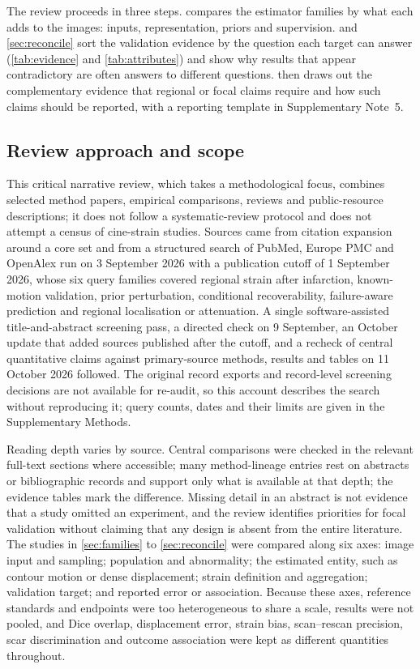 The review proceeds in three steps.  compares the estimator families by what each adds to the images: inputs, representation, priors and supervision.  and \cref{sec:reconcile} sort the validation evidence by the question each target can answer (\cref{tab:evidence} and \cref{tab:attributes}) and show why results that appear contradictory are often answers to different questions.  then draws out the complementary evidence that regional or focal claims require and how such claims should be reported, with a reporting template in Supplementary Note~5.

\subsection{Review approach and scope}

This critical narrative review, which takes a methodological focus, combines selected method papers, empirical comparisons, reviews and public-resource descriptions; it does not follow a systematic-review protocol and does not attempt a census of cine-strain studies. Sources came from citation expansion around a core set and from a structured search of PubMed, Europe PMC and OpenAlex run on 3 September 2026 with a publication cutoff of 1 September 2026, whose six query families covered regional strain after infarction, known-motion validation, prior perturbation, conditional recoverability, failure-aware prediction and regional localisation or attenuation. A single software-assisted title-and-abstract screening pass, a directed check on 9 September, an October update that added sources published after the cutoff, and a recheck of central quantitative claims against primary-source methods, results and tables on 11 October 2026 followed. The original record exports and record-level screening decisions are not available for re-audit, so this account describes the search without reproducing it; query counts, dates and their limits are given in the Supplementary Methods.

Reading depth varies by source. Central comparisons were checked in the relevant full-text sections where accessible; many method-lineage entries rest on abstracts or bibliographic records and support only what is available at that depth; the evidence tables mark the difference. Missing detail in an abstract is not evidence that a study omitted an experiment, and the review identifies priorities for focal validation without claiming that any design is absent from the entire literature. The studies in \cref{sec:families} to \cref{sec:reconcile} were compared along six axes: image input and sampling; population and abnormality; the estimated entity, such as contour motion or dense displacement; strain definition and aggregation; validation target; and reported error or association. Because these axes, reference standards and endpoints were too heterogeneous to share a scale, results were not pooled, and Dice overlap, displacement error, strain bias, scan--rescan precision, scar discrimination and outcome association were kept as different quantities throughout.

